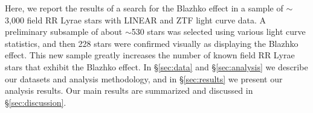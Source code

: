 Here, we report the results of a search for the Blazhko effect in a sample of $\sim$3,000 field RR Lyrae stars with
LINEAR and ZTF light curve data. A preliminary subsample of about $\sim$530 stars was selected using various
light curve statistics, and then 228 stars were confirmed visually as displaying the Blazhko effect. This new
sample greatly increases the number of known field RR Lyrae stars that exhibit the Blazhko effect. In \S\ref{sec:data}
and \S\ref{sec:analysis} we describe our datasets and analysis methodology, and in \S\ref{sec:results} we present our analysis results. 
Our main results are summarized and discussed in \S\ref{sec:discussion}.

